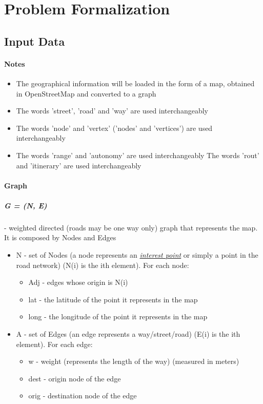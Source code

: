 \chapter{Problem Formalization}



\section{Input Data}


\subsubsection{Notes}
\begin{itemize}
    \item The geographical information will be loaded in the form of a map, obtained in OpenStreetMap and converted to a graph
    \item The words 'street', 'road' and 'way' are used interchangeably
    \item The words 'node' and 'vertex' ('nodes' and 'vertices') are used interchangeably
    \item The words 'range' and 'autonomy' are used interchangeably
    \irem The words 'rout' and 'itinerary' are used interchangeably
\end{itemize}


\subsubsection{Graph}
\paragraph{G = (N, E)} - weighted directed (roads may be one way only) graph that represents the map. It is composed by Nodes and Edges
\begin{itemize}

	\item N - set of Nodes (a node represents an \uline{\textit{interest point}} or simply a point in the road network) (N(i) is the ith element). For each node:
\begin{itemize}
	\item Adj - edges whose origin is N(i)
	\item lat - the latitude of the point it represents in the map
	\item long - the longitude of the point it represents in the map
\end{itemize}

	\item A - set of Edges (an edge represents a way/street/road) (E(i) is the ith element). For each edge:
\begin{itemize}
	\item w - weight (represents the length of the way) (measured in meters)
	\item dest - origin node of the edge
	\item orig - destination node of the edge
\end{itemize}

\end{itemize}

